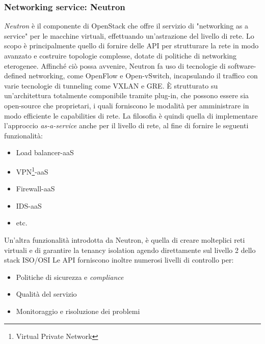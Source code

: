 \documentclass[../main.tex]{subfiles}
\begin{document}
\subsubsection{Networking service: Neutron}
\textit{Neutron} è il componente di OpenStack che offre il servizio di "networking as a service" per le macchine virtuali, effettuando un'astrazione del livello di rete.
Lo scopo è principalmente quello di fornire delle API per strutturare la rete in modo avanzato e costruire topologie complesse, dotate di politiche di networking eterogenee.
Affinché ciò possa avvenire, Neutron fa uso di tecnologie di software-defined networking, come OpenFlow e Open-vSwitch, incapsulando il traffico con varie tecnologie di tunneling come VXLAN e GRE.
\`E strutturato su un'architettura totalmente componibile tramite plug-in, che possono essere sia open-source che proprietari, i quali forniscono le modalità per amministrare in modo efficiente le capabilities di rete.
La filosofia è quindi quella di implementare l'approccio \textit{as-a-service} anche per il livello di rete, al fine di fornire le seguenti funzionalità:
\begin{itemize}
\item Load balancer-aaS
\item VPN\footnote{Virtual Private Network}-aaS
\item Firewall-aaS
\item IDS-aaS
\item etc.
\end{itemize}
Un'altra funzionalità introdotta da Neutron, è quella di creare molteplici reti virtuali e di garantire la tenancy isolation agendo direttamente sul livello 2 dello stack ISO/OSI
Le API forniscono inoltre numerosi livelli di controllo per:
\begin{itemize}
\item Politiche di sicurezza e \textit{compliance}
\item Qualità del servizio
\item Monitoraggio e risoluzione dei problemi
\end{itemize}

\end{document}
